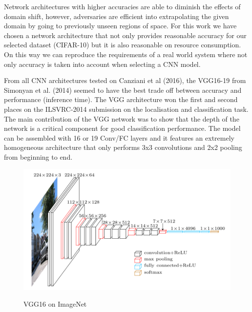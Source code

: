 Network architectures with higher accuracies are able to diminish the effects of domain shift, however, adversaries are efficient into extrapolating the given domain by going to previously unseen regions of space. For this work we have chosen a network architecture that not only provides reasonable accuracy for our selected dataset (CIFAR-10) but it is also reasonable on resource consumption. On this way we can reproduce the requirements of a real world system where not only accuracy is taken into account when selecting a CNN model.

From all CNN architectures tested on Canziani et al (2016), the VGG16-19 from Simonyan et al. (2014)  seemed to have the best trade off between accuracy and performance (inference time). The VGG architecture won the first and second places on the ILSVRC-2014 submission on the localisation and classification task. The main contribution of the VGG network was to show that the depth of the network is a critical component for good classification performance. The model can be assembled with 16 or 19 Conv/FC layers and it features an extremely homogeneous architecture that only performs 3x3 convolutions and 2x2 pooling from beginning to end.

\begin{figure}[!h]
	\centering
	\includegraphics[scale=0.6]{imagenet_vgg16.png}
	\caption{VGG16 on ImageNet}
	\cite{simonyan2014very}
	\label{fig:vgg16}
\end{figure}

